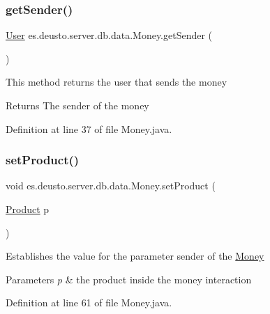 \subsubsection{\texorpdfstring{get\+Sender()}{getSender()}}
{\footnotesize\ttfamily \hyperlink{classes_1_1deusto_1_1server_1_1db_1_1data_1_1_user}{User} es.\+deusto.\+server.\+db.\+data.\+Money.\+get\+Sender (\begin{DoxyParamCaption}{ }\end{DoxyParamCaption})}

This method returns the user that sends the money \begin{DoxyReturn}{Returns}
The sender of the money 
\end{DoxyReturn}


Definition at line 37 of file Money.\+java.

\mbox{\label{classes_1_1deusto_1_1server_1_1db_1_1data_1_1_money_a494f3b9ca18e88ca4b96e9c8d90e0557}} 
\subsubsection{\texorpdfstring{set\+Product()}{setProduct()}}
{\footnotesize\ttfamily void es.\+deusto.\+server.\+db.\+data.\+Money.\+set\+Product (\begin{DoxyParamCaption}\item[{\hyperlink{classes_1_1deusto_1_1server_1_1db_1_1data_1_1_product}{Product}}]{p }\end{DoxyParamCaption})}

Establishes the value for the parameter sender of the \hyperlink{classes_1_1deusto_1_1server_1_1db_1_1data_1_1_money}{Money} 
\begin{DoxyParams}{Parameters}
{\em p} & the product inside the money interaction \\
\hline
\end{DoxyParams}


Definition at line 61 of file Money.\+java.

\mbox{\label{classes_1_1deusto_1_1server_1_1db_1_1data_1_1_money_ad5e5b686cbe1ce6e631915f40ef70892}} 
